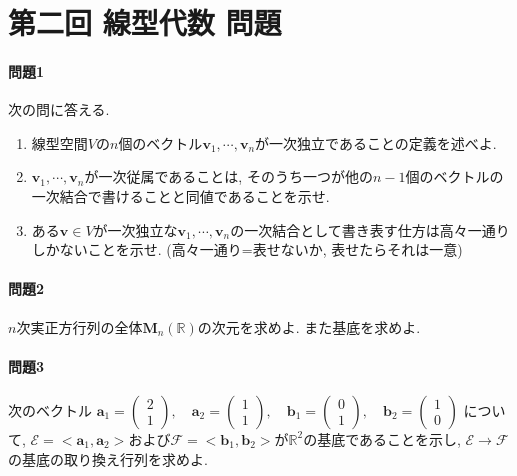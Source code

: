 \documentclass[a4j,dvipdfmx]{jsarticle}
\begin{document}
    \part*{第二回 線型代数 問題}
    \subsection*{問題1}
        次の問に答える.
        \begin{enumerate}
            \item 線型空間$V$の$n$個のベクトル$\bm{v}_1,\cdots,\bm{v}_n$が一次独立であることの定義を述べよ.
            \item $\bm{v}_1,\cdots,\bm{v}_n$が一次従属であることは, そのうち一つが他の$n-1$個のベクトルの一次結合で書けることと同値であることを示せ.
            \item ある$\bm{v}\in V$が一次独立な$\bm{v}_1,\cdots,\bm{v}_n$の一次結合として書き表す仕方は高々一通りしかないことを示せ. (高々一通り=表せないか, 表せたらそれは一意)
        \end{enumerate}
    \subsection*{問題2}
        $n$次実正方行列の全体$\bm{M}_n(\mathbb{R})$の次元を求めよ. また基底を求めよ.
    \subsection*{問題3}
        次のベクトル
        $\bm{a}_1=\begin{pmatrix}
                2 \\ 1
            \end{pmatrix},\quad
            \bm{a}_2=\begin{pmatrix}
                1 \\ 1
            \end{pmatrix},\quad
            \bm{b}_1=\begin{pmatrix}
                0 \\ 1
            \end{pmatrix},\quad
            \bm{b}_2=\begin{pmatrix}
                1 \\ 0
            \end{pmatrix}$
        について, $\mathcal{E} = <\bm{a}_1,\bm{a}_2>$および$\mathcal{F} = <\bm{b}_1,\bm{b}_2>$が$\mathbb{R}^2$の基底であることを示し, $\mathcal{E}\to\mathcal{F}$の基底の取り換え行列を求めよ.
\end{document}
